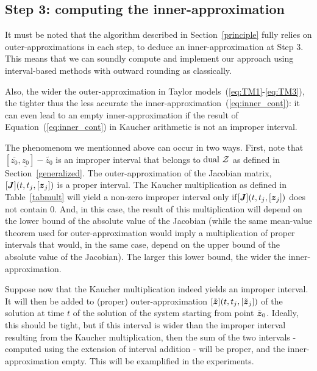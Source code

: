 \documentclass{sig-alternate-05-2015} %
\newcommand{\dual}{\mbox{dual }}
\newtheorem{remark}{Remark}
\begin{document}
\subsection{Step 3: computing the inner-approximation}
\label{practicalissues}

It must be noted that the algorithm described in Section~\ref{principle} fully relies on outer-approximations in each step, 
to deduce an inner-approximation at Step 3. This means that we can soundly compute and implement our approach using interval-based 
methods with outward rounding as classically. 

Also, the wider the outer-approximation in Taylor models~(\ref{eq:TM1}-\ref{eq:TM3}), the tighter thus the less accurate the inner-approximation~(\ref{eq:inner_cont}): 
it can even  lead to an empty inner-approximation if the result of Equation~(\ref{eq:inner_cont}) in Kaucher arithmetic is not an improper interval. 

The phenomenom we mentionned above can occur in two ways. First, note that $[\overline{z_0},\underline{z_0}]-\tilde{z_0}$ is an improper interval that belongs to $\dual {\cal Z}$ as defined 
in Section~\ref{generalized}. The outer-approximation of the Jacobian matrix,  $[\J](t,t_j,[{\z}_j])$ is a proper interval. The Kaucher multiplication as defined in Table~\ref{tabmult}
will yield a non-zero improper interval only if$[\J](t,t_j,[{\z}_j])$ does not contain $0$. And, in this case, the result of this multiplication will depend on the 
lower bound of the absolute value of the Jacobian (while the same mean-value theorem used for outer-approximation would imply a multiplication of proper intervals that would, 
in the same case, depend on the upper bound of the absolute value of the Jacobian). The larger this lower bound, the wider the inner-approximation. 

Suppose now that the Kaucher multiplication indeed yields an improper interval. It will then be added to (proper) outer-approximation  $[\tilde{\z}](t,t_j,[\tilde{\z}_j])$ 
of the solution at time $t$ of the solution of the system starting from point $\tilde{\z}_0$. Ideally, this should be tight, but if this interval is wider than the improper 
interval resulting from the Kaucher multiplication, then the sum of the two intervals - computed using the extension of interval addition - will be proper, 
and the inner-approximation empty. This will be examplified in the experiments. 
\end{document}
